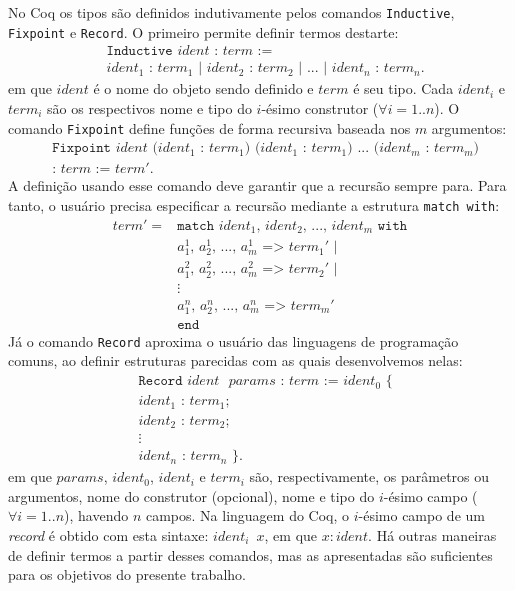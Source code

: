 No Coq os tipos são definidos indutivamente pelos comandos \texttt{Inductive}, \texttt{Fixpoint} e \texttt{Record}. O primeiro permite definir termos destarte: \begin{align*}
&\texttt{Inductive $ident$ : $term$ :=}\\ &\texttt{$ident_1$ : $term_1$ | $ident_2$ : $term_2$ | $...$ | $ident_n$ : $term_n$.}
\end{align*} em que $ident$ é o nome do objeto sendo definido e $term$ é seu tipo. Cada $ident_i$ e $term_i$ são os respectivos nome e tipo do $i$-ésimo construtor ($\forall i=1..n$). O comando \texttt{Fixpoint} define funções de forma recursiva baseada nos $m$ argumentos: \begin{align*}
&\texttt{Fixpoint $ident$ ($ident_1$ : $term_1$) ($ident_1$ : $term_1$) $...$ ($ident_m$ : $term_m$)}\\&\texttt{: $term$ := $term'$.}
\end{align*} A definição usando esse comando deve garantir que a recursão sempre para. Para tanto, o usuário precisa especificar a recursão mediante a estrutura \texttt{match with}: \begin{align*}
term' = \text{} & \texttt{match $ident_1$, $ident_2$, ..., $ident_m$ with}\\
& \texttt{$a_1^1$, $a_2^1$, $...$, $a_m^1$ => $term_1'$ |}\\
& \texttt{$a_1^2$, $a_2^2$, $...$, $a_m^2$ => $term_2'$ |}\\
& \vdots\\
& \texttt{$a_1^n$, $a_2^n$, $...$, $a_m^n$ => $term_m'$}\\
& \texttt{end}
\end{align*} Já o comando \texttt{Record} aproxima o usuário das linguagens de programação comuns, ao definir estruturas parecidas com as quais desenvolvemos nelas: \begin{align*}
&\texttt{Record $ident$ $params$ : $term$ := $ident_0$ \{}\\
&\texttt{$ident_1$ : $term_1$;}\\
&\texttt{$ident_2$ : $term_2$;}\\
&\vdots\\
&\texttt{$ident_n$ : $term_n$ \}.}
\end{align*} em que $params$, $ident_0$, $ident_i$ e $term_i$ são, respectivamente, os parâmetros ou argumentos, nome do construtor (opcional), nome e tipo do $i$-ésimo campo ($\forall i = 1..n$), havendo $n$ campos. Na linguagem do Coq, o $i$-ésimo campo de um \textit{record} é obtido com esta sintaxe: \texttt{$ident_i$ $x$}, em que $x : ident$. Há outras maneiras de definir termos a partir desses comandos, mas as apresentadas são suficientes para os objetivos do presente trabalho.

